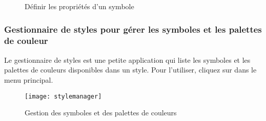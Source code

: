\begin{figure}[ht]
\centering
   \hspace{1cm}
   \hspace{1cm}
\caption{Définir les propriétés d'un symbole \nixcaption}
\end{figure}

\subsubsection{Gestionnaire de styles pour gérer les symboles et les palettes de couleur}\label{subsec:stylemanager}

Le gestionnaire de styles est une petite application qui liste les symboles et les 
palettes de couleurs disponibles dans un style. Pour l'utiliser, cliquez sur 
 \arrow {} dans le 
menu principal.

\begin{figure}[ht]
   \centering
   \texttt{[image: stylemanager]}
   \caption{Gestion des symboles et des palettes de couleurs \nixcaption}
   \label{fig:stylemanager}
\end{figure}

